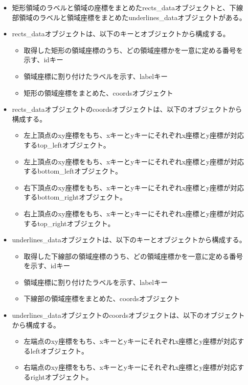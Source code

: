 \begin{itemize}
    \item 矩形領域のラベルと領域の座標をまとめたrects\_dataオブジェクトと、下線部領域のラベルと領域座標をまとめたunderlines\_dataオブジェクトがある。
    \item rects\_dataオブジェクトは、以下のキーとオブジェクトから構成する。
        \begin{itemize}
            \item 取得した矩形の領域座標のうち、どの領域座標かを一意に定める番号を示す、idキー
            \item 領域座標に割り付けたラベルを示す、labelキー
            \item 矩形の領域座標をまとめた、coordsオブジェクト
        \end{itemize}
    \item rects\_dataオブジェクトのcoordsオブジェクトは、以下のオブジェクトから構成する。
        \begin{itemize}
            \item 左上頂点のxy座標をもち、xキーとyキーにそれぞれx座標とy座標が対応するtop\_leftオブジェクト。
            \item 左上頂点のxy座標をもち、xキーとyキーにそれぞれx座標とy座標が対応するbottom\_leftオブジェクト。
            \item 右下頂点のxy座標をもち、xキーとyキーにそれぞれx座標とy座標が対応するbottom\_rightオブジェクト。
            \item 右上頂点のxy座標をもち、xキーとyキーにそれぞれx座標とy座標が対応するtop\_rightオブジェクト。
        \end{itemize}
    \item underlines\_dataオブジェクトは、以下のキーとオブジェクトから構成する。
        \begin{itemize}
            \item 取得した下線部の領域座標のうち、どの領域座標かを一意に定める番号を示す、idキー
            \item 領域座標に割り付けたラベルを示す、labelキー
            \item 下線部の領域座標をまとめた、coordsオブジェクト
        \end{itemize}
    \item underlines\_dataオブジェクトのcoordsオブジェクトは、以下のオブジェクトから構成する。
    \begin{itemize}
        \item 左端点のxy座標をもち、xキーとyキーにそれぞれx座標とy座標が対応するleftオブジェクト。
        \item 右端点のxy座標をもち、xキーとyキーにそれぞれx座標とy座標が対応するrightオブジェクト。
    \end{itemize}
\end{itemize}


